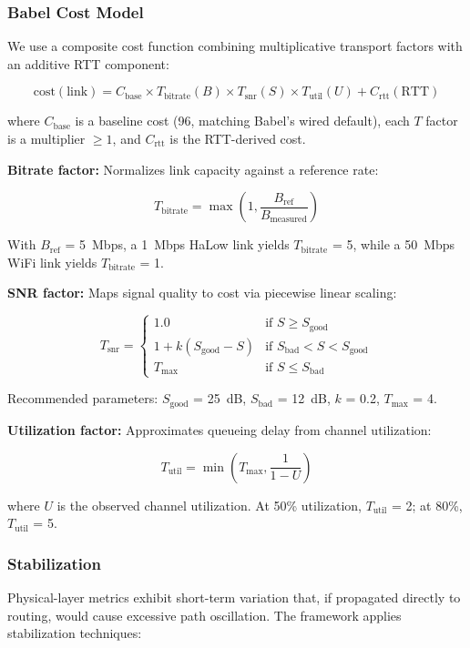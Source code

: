 \subsubsection{Babel Cost Model}

We use a composite cost function combining multiplicative transport factors with an additive RTT component:

\[
\text{cost}(\text{link}) = C_{\text{base}} \times T_{\text{bitrate}}(B) \times T_{\text{snr}}(S) \times T_{\text{util}}(U) + C_{\text{rtt}}(\text{RTT})
\]

where $C_{\text{base}}$ is a baseline cost (96, matching Babel's wired default), each $T$ factor is a multiplier $\geq 1$, and $C_{\text{rtt}}$ is the RTT-derived cost.

\textbf{Bitrate factor:} Normalizes link capacity against a reference rate:

\[
T_{\text{bitrate}} = \max\left(1, \frac{B_{\text{ref}}}{B_{\text{measured}}}\right)
\]

With $B_{\text{ref}}$ = 5~Mbps, a 1~Mbps HaLow link yields $T_{\text{bitrate}}$ = 5, while a 50~Mbps WiFi link yields $T_{\text{bitrate}}$ = 1.

\textbf{SNR factor:} Maps signal quality to cost via piecewise linear scaling:

\[
T_{\text{snr}} = \begin{cases}
1.0 & \text{if } S \geq S_{\text{good}} \\
1 + k(S_{\text{good}} - S) & \text{if } S_{\text{bad}} < S < S_{\text{good}} \\
T_{\text{max}} & \text{if } S \leq S_{\text{bad}}
\end{cases}
\]

Recommended parameters: $S_{\text{good}}$ = 25~dB, $S_{\text{bad}}$ = 12~dB, $k$ = 0.2, $T_{\text{max}}$ = 4.

\textbf{Utilization factor:} Approximates queueing delay from channel utilization:

\[
T_{\text{util}} = \min\left(T_{\text{max}}, \frac{1}{1 - U}\right)
\]

where $U$ is the observed channel utilization. At 50\% utilization, $T_{\text{util}}$ = 2; at 80\%, $T_{\text{util}}$ = 5.

\subsubsection{Stabilization}

Physical-layer metrics exhibit short-term variation that, if propagated directly to routing, would cause excessive path oscillation. The framework applies stabilization techniques:

